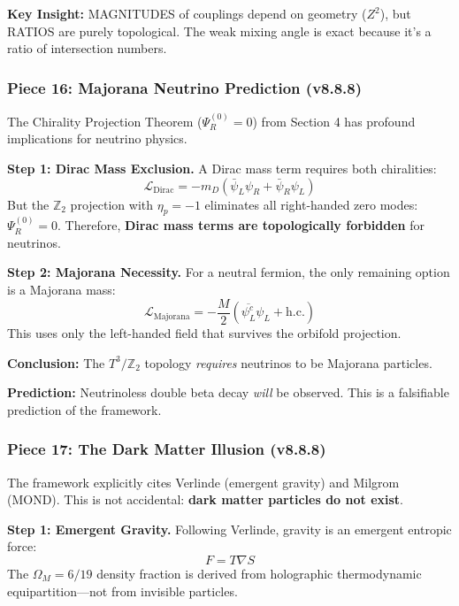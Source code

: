 \documentclass[12pt,a4paper]{article}
\newcommand{\Ztwo}{\mathbb{Z}_2}
\newcommand{\Tthree}{T^3}
\newcommand{\Zsq}{Z^2}
\begin{document}
\textbf{Key Insight:} MAGNITUDES of couplings depend on geometry ($\Zsq$), but RATIOS
are purely topological. The weak mixing angle is exact because it's a ratio
of intersection numbers.

\subsubsection{Piece 16: Majorana Neutrino Prediction (v8.8.8)}

The Chirality Projection Theorem ($\Psi_R^{(0)} = 0$) from Section 4 has profound implications for neutrino physics.

\textbf{Step 1: Dirac Mass Exclusion.}
A Dirac mass term requires both chiralities:
\begin{equation}
\mathcal{L}_{\text{Dirac}} = -m_D (\bar{\psi}_L \psi_R + \bar{\psi}_R \psi_L)
\end{equation}
But the $\Ztwo$ projection with $\eta_p = -1$ eliminates all right-handed zero modes: $\Psi_R^{(0)} = 0$. Therefore, \textbf{Dirac mass terms are topologically forbidden} for neutrinos.

\textbf{Step 2: Majorana Necessity.}
For a neutral fermion, the only remaining option is a Majorana mass:
\begin{equation}
\mathcal{L}_{\text{Majorana}} = -\frac{M}{2}(\overline{\psi_L^c} \psi_L + \text{h.c.})
\end{equation}
This uses only the left-handed field that survives the orbifold projection.

\textbf{Conclusion:} The $\Tthree/\Ztwo$ topology \textit{requires} neutrinos to be Majorana particles.

\textbf{Prediction:} Neutrinoless double beta decay \textit{will} be observed. This is a falsifiable prediction of the framework.

\subsubsection{Piece 17: The Dark Matter Illusion (v8.8.8)}

The framework explicitly cites Verlinde (emergent gravity) and Milgrom (MOND). This is not accidental: \textbf{dark matter particles do not exist}.

\textbf{Step 1: Emergent Gravity.}
Following Verlinde, gravity is an emergent entropic force:
\begin{equation}
F = T \nabla S
\end{equation}
The $\Omega_M = 6/19$ density fraction is derived from holographic thermodynamic equipartition---not from invisible particles.
\end{document}
